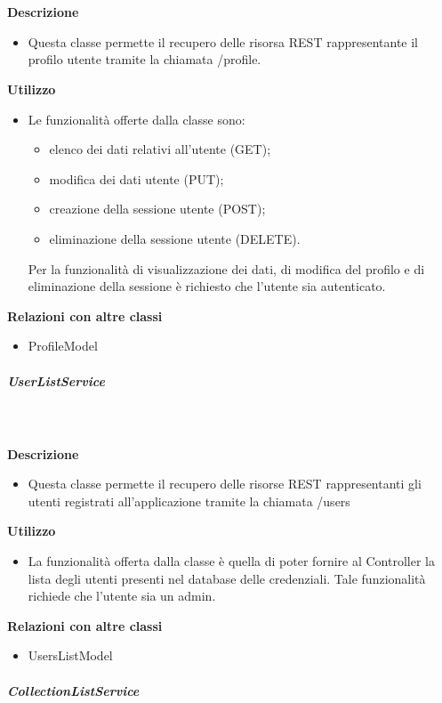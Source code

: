         \textbf{\\ \\ Descrizione} 
          \begin{itemize}
            \item[] Questa classe permette il recupero delle risorsa REST rappresentante il profilo utente tramite la chiamata /profile.
          \end{itemize}      
        \textbf{Utilizzo}  
          \begin{itemize}
            \item[] Le funzionalità offerte dalla classe sono:
\begin{itemize}
\item elenco dei dati relativi all'utente (GET);
\item modifica dei dati utente (PUT);
\item creazione della sessione utente (POST);
\item eliminazione della sessione utente (DELETE).
\end{itemize}

Per la funzionalità di visualizzazione dei dati, di modifica del profilo e di eliminazione della sessione è richiesto che l'utente sia autenticato.
          \end{itemize}
          \textbf{Relazioni con altre classi}
          \begin{itemize}
              \item{ProfileModel}
          \end{itemize}
      \subparagraph{UserListService}
        
        \textbf{\\ \\ Descrizione} 
          \begin{itemize}
            \item[] Questa classe permette il recupero delle risorse REST rappresentanti gli utenti registrati all'applicazione tramite la chiamata /users
          \end{itemize}      
        \textbf{Utilizzo}  
          \begin{itemize}
            \item[] La funzionalità offerta dalla classe è quella di poter fornire al Controller la lista degli utenti presenti nel database delle credenziali.
Tale funzionalità richiede che l'utente sia un admin.
          \end{itemize}
          \textbf{Relazioni con altre classi}
          \begin{itemize}
              \item{UsersListModel}
          \end{itemize}
      \subparagraph{CollectionListService}
        

